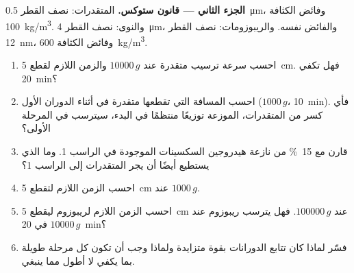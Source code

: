 \begin{problem}
\medskip
\noindent\textbf{الجزء الثاني --- قانون ستوكس.}
المتقدرات: نصف القطر \qty{0.5}{\micro m}، وفائض الكثافة
\qty{100}{kg/m^3}. والنوى: نصف القطر \qty{4}{\micro m}، والفائض
نفسه. والريبوزومات: نصف القطر \qty{12}{nm}، وفائض الكثافة
\qty{600}{kg/m^3}.
\begin{enumerate}[resume]
  \item احسب سرعة ترسيب متقدرة عند $\num{10000}\,g$ والزمن اللازم
        لقطع \qty{5}{cm}. فهل تكفي \qty{20}{min}؟
  \item احسب المسافة التي تقطعها متقدرة في أثناء الدوران الأول
        ($1000\,g$، \qty{10}{min}). فأي كسر من المتقدرات، الموزعة
        توزيعًا منتظمًا في البدء، سيترسب في المرحلة الأولى؟
  \item قارن مع \qty{15}{\%} من نازعة هيدروجين السكسينات الموجودة في
        الراسب 1. وما الذي يستطيع أيضًا أن يجر المتقدرات إلى الراسب 1؟
  \item احسب الزمن اللازم  لتقطع \qty{5}{cm} عند $1000\,g$.
  \item احسب الزمن اللازم لريبوزوم ليقطع \qty{5}{cm} عند
        $\num{100000}\,g$. فهل يترسب ريبوزوم عند $\num{10000}\,g$ في
        \qty{20}{min}؟
  \item فسّر لماذا كان تتابع الدورانات بقوة متزايدة ولماذا وجب أن
        تكون كل مرحلة طويلة بما يكفي لا أطول مما ينبغي.
\end{enumerate}


\end{problem}
